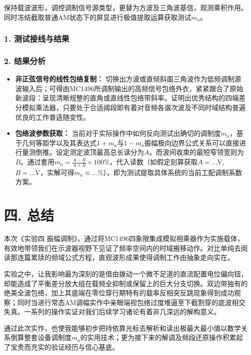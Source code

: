 \documentclass[12pt]{article}
\begin{document}
保持载波波形，调控调制信号源类型，更替为方波及三角波基信，观测乘积作用。同时冻结截取普通AM状态下的屏显进行极值提取运算获取测试$m_a$。

\subsubsection*{1. 测试接线与结果}



\subsubsection*{2. 结果分析}
\begin{itemize}
    \item \textbf{非正弦信号的线性包络复制：} 切换出方波或直倾斜面三角波作为低频调制源波输入后；可得由MC1496所调制输出的高频信号包络外衣，紧紧跟合了原始新波段：呈现清晰规整的直角或直线性包络带斜率。证明出优秀结构的四端差分模拟乘法器，只要处于合适阈段即有着对音频各谐次波及不同时域结构普遍优良的工作普适随变性。
    \item \textbf{包络波参数获取：} 当前对于实际操作中如何反向测试出确切的调制度$m_a$，基于几何等距学以及其表达式$1+m_a$与$1-m_a$振幅极向边界公式关系可以直接进行量测倒推。设定测定波顶最高总长读分为$A$，而波间收束的最短窄领宽则为$B$。通过套用$m_a = \frac{A - B}{A + B} \times 100\%$，代入读数（如假定刻算获取$A = ...\text{V}$, $B = ...\text{V}$，实解可得$m_a \approx ...\%$），即为测试提取具体系统的当前工配调制系数方案。
\end{itemize}

\section*{四. 总结}

本次《实验四 振幅调制》，通过将MC1496四象限集成模拟相乘器作为实施载体，有效地带领我们在示波器视野下见证了频率空间内的时域搬移动作。对比单纯去阅读那连篇累牍的频域公式方程，直观波形成果使得调制工作由抽象走向实在。

实验之中，让我影响最为深刻的是借由拨动一个微不足道的直流配置电位偏向钮，却能造成了平衡差分放大组在载频全抑制或保留上的巨大分支切换。双边带独有的绝美全波包络，加上其底端在零位穿行期特有的载率反相突反跳现象得到成功观察；同时当进行常态AM调幅实作中亲眼端视包络过度堆逼至下截割穿的底波相交失真。一系列的操作实证对我们后续学习诸论有着非几深远的解构意义。

通过此次实作，也使我能够初步把持依靠光标去解析和读出极最大最小值以数学关系倒算整套设备调制度$m_a$的实用技术；更为接下来的解调及频段还原操作积累起了宝贵而充实的验证经历与信心基底。
\end{document}
